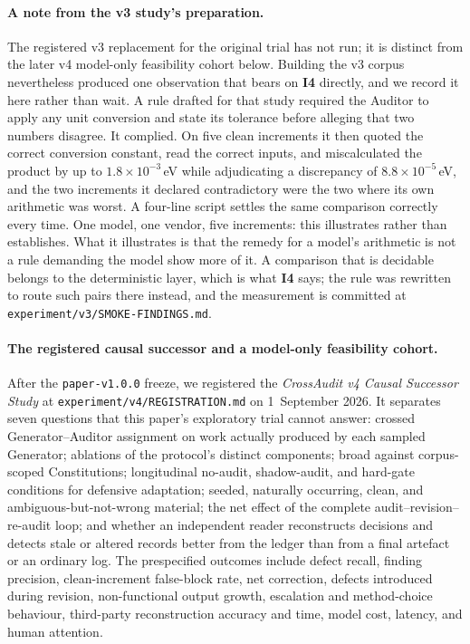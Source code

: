 \documentclass[11pt,letterpaper]{article}
\newcommand{\invariant}[1]{\textbf{I#1}}
\begin{document}
\paragraph{A note from the v3 study's preparation.} The registered v3 replacement for the original trial has not run; it is distinct from the later v4 model-only feasibility cohort below. Building the v3 corpus nevertheless produced one observation that bears on \invariant{4} directly, and we record it here rather than wait. A rule drafted for that study required the Auditor to apply any unit conversion and state its tolerance before alleging that two numbers disagree. It complied. On five clean increments it then quoted the correct conversion constant, read the correct inputs, and miscalculated the product by up to $1.8\times10^{-3}$\,eV while adjudicating a discrepancy of $8.8\times10^{-5}$\,eV, and the two increments it declared contradictory were the two where its own arithmetic was worst. A four-line script settles the same comparison correctly every time. One model, one vendor, five increments: this illustrates rather than establishes. What it illustrates is that the remedy for a model's arithmetic is not a rule demanding the model show more of it. A comparison that is decidable belongs to the deterministic layer, which is what \invariant{4} says; the rule was rewritten to route such pairs there instead, and the measurement is committed at \texttt{experiment/v3/SMOKE-FINDINGS.md}.

\paragraph{The registered causal successor and a model-only feasibility cohort.}\label{sec:successor} After the \texttt{paper-v1.0.0} freeze, we registered the \emph{CrossAudit v4 Causal Successor Study} at \texttt{experiment/v4/REGISTRATION.md} on 1~September 2026. It separates seven questions that this paper's exploratory trial cannot answer: crossed Generator--Auditor assignment on work actually produced by each sampled Generator; ablations of the protocol's distinct components; broad against corpus-scoped Constitutions; longitudinal no-audit, shadow-audit, and hard-gate conditions for defensive adaptation; seeded, naturally occurring, clean, and ambiguous-but-not-wrong material; the net effect of the complete audit--revision--re-audit loop; and whether an independent reader reconstructs decisions and detects stale or altered records better from the ledger than from a final artefact or an ordinary log. The prespecified outcomes include defect recall, finding precision, clean-increment false-block rate, net correction, defects introduced during revision, non-functional output growth, escalation and method-choice behaviour, third-party reconstruction accuracy and time, model cost, latency, and human attention.
\end{document}
